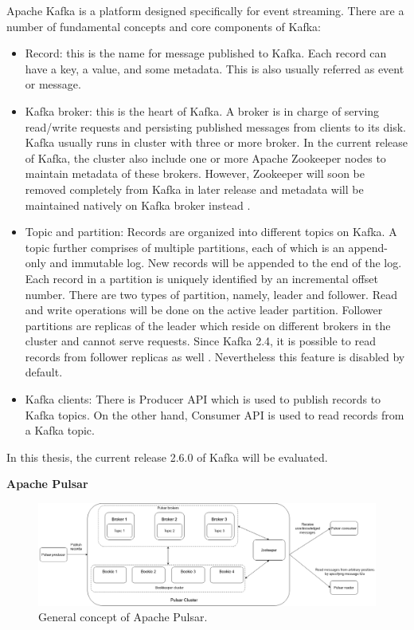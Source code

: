 Apache Kafka is a platform designed specifically for event streaming. There are a number of fundamental concepts and core components of Kafka:
\begin{itemize}
	\item Record: this is the name for message published to Kafka. Each record can have a key, a value, and some metadata. This is also usually referred as event or message.
	\item Kafka broker: this is the heart of Kafka. A broker is in charge of serving read/write requests and persisting published messages from clients to its disk. Kafka usually runs in cluster with three or more broker. In the current release of Kafka, the cluster also include one or more Apache Zookeeper \cite{apachezookeeper} nodes to maintain metadata of these brokers. However, Zookeeper will soon be removed completely from Kafka in later release and metadata will be maintained natively on Kafka broker instead \cite{kafkaremovezookeeper}.
	\item Topic and partition: Records are organized into different topics on Kafka. A topic further comprises of multiple partitions, each of which is an append-only and immutable log. New records will be appended to the end of the log. Each record in a partition is uniquely identified by an incremental offset number. There are two types of partition, namely, leader and follower. Read and write operations will be done on the active leader partition. Follower partitions are replicas of the leader which reside on different brokers in the cluster and cannot serve requests. Since Kafka 2.4, it is possible to read records from follower replicas as well \cite{kafkareadfromfollower}. Nevertheless this feature is disabled by default.
	\item Kafka clients: There is Producer API which is used to publish records to Kafka topics. On the other hand, Consumer API is used to read records from a Kafka topic. 
\end{itemize}

In this thesis, the current release 2.6.0 of Kafka will be evaluated.

\textbf{Apache Pulsar}

\begin{figure}[h]
	\includegraphics[width=\linewidth]{images/general-pulsar.png}
	\caption{General concept of Apache Pulsar.}
	\label{fig:pulsargeneral}
\end{figure}


